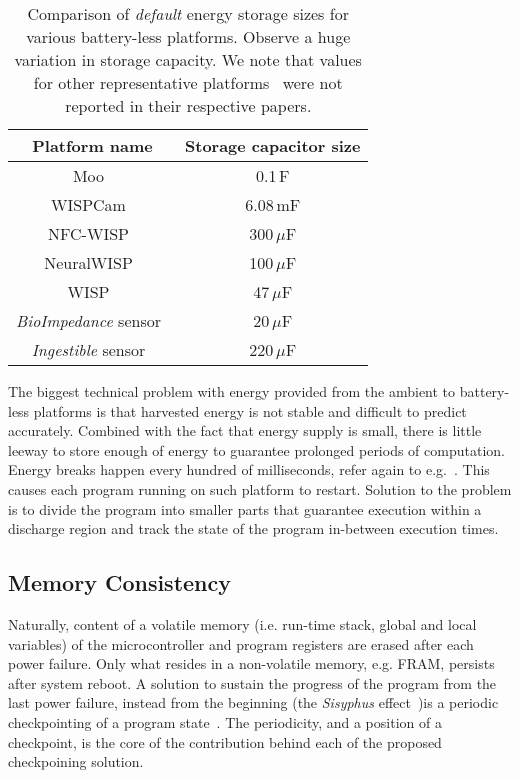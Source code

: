 \begin{table}
	\begin{tabular}{|c|c|}
	\hline
	Platform name & Storage capacitor size \\
	\hline \hline
	Moo~\cite{moo} & 0.1\,F \\
	WISPCam~\cite{naderiparizi_rfid_2015} & 6.08\,mF \\ %
	NFC-WISP~\cite{zhao_rfid_2015} & 300\,$\mu$F \\
	NeuralWISP~\cite{holleman_biocas_2008} & 100\,$\mu$F \\
	WISP~\cite{wisp5} & 47\,$\mu$F \\
	{\em BioImpedance} sensor~\cite{rodriguez_tbcs_2015} & 20\,$\mu$F \\
	{\em Ingestible} sensor~\cite{nadeau_naturebio_2017} & 220\,$\mu$F\\
	\hline
	\end{tabular} 
\caption{Comparison of {\em default} energy storage sizes for various battery-less platforms. Observe a huge variation in storage capacity. We note that values for other representative platforms~\cite{medusa_farsens_2017,talla_imwut_2017,liu_sigcomm_2013,parks_sigcomm_2014} were not reported in their respective papers.}
\label{table:capacitor}
\end{table}

The biggest technical problem with energy provided from the ambient to battery-less platforms is that harvested energy is not stable and difficult to predict accurately. Combined with the fact that energy supply is small, there is little leeway to store enough of energy to guarantee prolonged periods of computation. Energy breaks happen every hundred of milliseconds, refer again to e.g.~\cite[Fig. 1]{mementos}. This causes each program running on such platform to restart. Solution to the problem is to divide the program into smaller parts that guarantee execution within a discharge region and track the state of the program in-between execution times.

\subsection{Memory Consistency}
\label{sec:background_consistency}

Naturally, content of a volatile memory (i.e. run-time stack, global and local variables) of the microcontroller and program registers are erased after each power failure. Only what resides in a non-volatile memory, e.g. FRAM, persists after system reboot. A solution to sustain the progress of the program from the last power failure, instead from the beginning (the \emph{Sisyphus} effect~\cite[Sec. 2]{mementos})is a periodic checkpointing of a program state~\cite{mementos,hibernusplusplus,quickrecall,idetic}. The periodicity, and a position of a checkpoint, is the core of the contribution behind each of the proposed checkpoining solution. 

